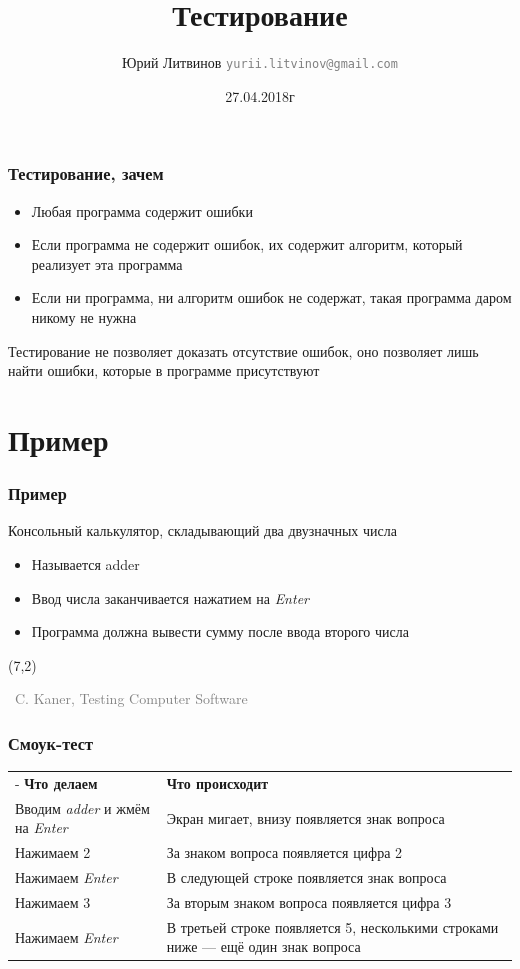\documentclass[xetex,mathserif,serif]{beamer}
\title{Тестирование}
\author[Юрий Литвинов]{Юрий Литвинов \newline \textcolor{gray}{\small\texttt{yurii.litvinov@gmail.com}}}
\date{27.04.2018г}
\newcommand{\attribution}[1] {
	\begin{flushright}\begin{scriptsize}\textcolor{gray}{\textcopyright\, #1}\end{scriptsize}\end{flushright}
}
\begin{document}
	
	\frame{\titlepage}

	\begin{frame}
		\frametitle{Тестирование, зачем}
		\begin{itemize}
			\item Любая программа содержит ошибки
			\item Если программа не содержит ошибок, их содержит алгоритм, который реализует эта программа
			\item Если ни программа, ни алгоритм ошибок не содержат, такая программа даром никому не нужна
		\end{itemize}
		Тестирование не позволяет доказать отсутствие ошибок, оно позволяет лишь найти ошибки, которые в программе присутствуют
	\end{frame}

	\section{Пример}

	\begin{frame}
		\frametitle{Пример}
		Консольный калькулятор, складывающий два двузначных числа
		\begin{itemize}
			\item Называется adder
			\item Ввод числа заканчивается нажатием на \textit{Enter}
			\item Программа должна вывести сумму после ввода второго числа
		\end{itemize}
		\begin{textblock}{5}(7,2)
			\attribution{C. Kaner, Testing Computer Software}
		\end{textblock}
	\end{frame}

	\begin{frame}
		\frametitle{Смоук-тест}
		\begin{center}
			\begin{tabu} {| X[0.6 l p] | X[1 l p] |}
				\tabucline-
				\everyrow{\tabucline-}
				\textbf{Что делаем}                             & \textbf{Что происходит}                                                            \\
				Вводим \textit{adder} и жмём на \textit{Enter}  & Экран мигает, внизу появляется знак вопроса                                        \\
				Нажимаем 2                                      & За знаком вопроса появляется цифра 2                                               \\
				Нажимаем \textit{Enter}                         & В следующей строке появляется знак вопроса                                         \\
				Нажимаем 3                                      & За вторым знаком вопроса появляется цифра 3                                        \\
				Нажимаем \textit{Enter}                         & В третьей строке появляется 5, несколькими строками ниже --- ещё один знак вопроса
			\end{tabu}
		\end{center}
	\end{frame}
\end{document}

